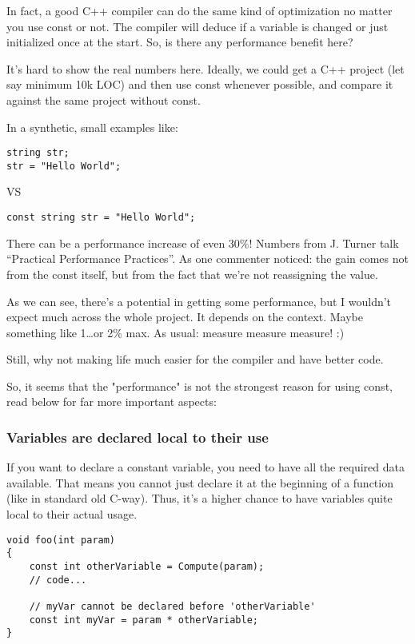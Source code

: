 In fact, a good C++ compiler can do the same kind of optimization no matter you use const or not. The compiler will deduce if a variable is changed or just initialized once at the start. So, is there any performance benefit here?

It’s hard to show the real numbers here. Ideally, we could get a C++ project (let say minimum 10k LOC) and then use const whenever possible, and compare it against the same project without const.

In a synthetic, small examples like:
\begin{verbatim}
string str;
str = "Hello World";
\end{verbatim}
VS
\begin{verbatim}
const string str = "Hello World";
\end{verbatim}

There can be a performance increase of even 30\%! Numbers from J. Turner talk “Practical Performance Practices”. As one commenter noticed: the gain comes not from the const itself, but from the fact that we're not reassigning the value.

As we can see, there’s a potential in getting some performance, but I wouldn’t expect much across the whole project. It depends on the context. Maybe something like 1…or 2\% max. As usual: measure measure measure! :)

Still, why not making life much easier for the compiler and have better code.

So, it seems that the "performance" is not the strongest reason for using const, read below for far more important aspects:

\subsubsection{Variables are declared local to their use}

If you want to declare a constant variable, you need to have all the required data available. That means you cannot just declare it at the beginning of a function (like in standard old C-way). Thus, it’s a higher chance to have variables quite local to their actual usage.

\begin{verbatim}
void foo(int param)
{
    const int otherVariable = Compute(param);
    // code...

    // myVar cannot be declared before 'otherVariable'
    const int myVar = param * otherVariable; 
}
\end{verbatim}

